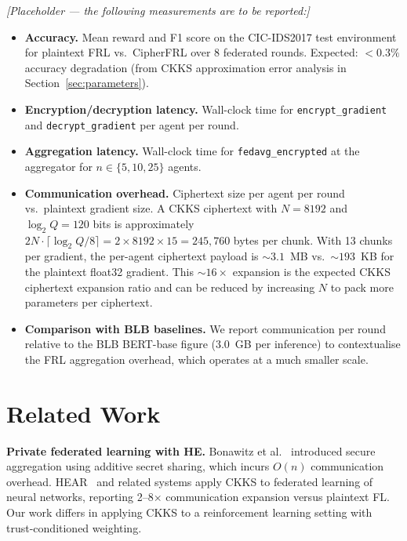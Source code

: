 \documentclass[letterpaper,journal]{IEEEtran}
\begin{document}
\textit{[Placeholder — the following measurements are to be reported:]}
\begin{itemize}
  \item \textbf{Accuracy.}
        Mean reward and F1 score on the CIC-IDS2017 test environment
        for plaintext FRL vs.\ CipherFRL over 8 federated rounds.
        Expected: $<0.3\%$ accuracy degradation (from CKKS approximation
        error analysis in Section~\ref{sec:parameters}).
  \item \textbf{Encryption/decryption latency.}
        Wall-clock time for \texttt{encrypt\_gradient} and
        \texttt{decrypt\_gradient} per agent per round.
  \item \textbf{Aggregation latency.}
        Wall-clock time for \texttt{fedavg\_encrypted} at the aggregator
        for $n \in \{5, 10, 25\}$ agents.
  \item \textbf{Communication overhead.}
        Ciphertext size per agent per round vs.\ plaintext gradient size.
        A CKKS ciphertext with $N=8192$ and $\log_2 Q = 120$ bits is
        approximately $2N \cdot \lceil \log_2 Q / 8 \rceil = 2 \times 8192
        \times 15 = 245{,}760$ bytes per chunk.
        With 13 chunks per gradient, the per-agent ciphertext payload is
        $\sim 3.1$~MB vs.\ $\sim 193$~KB for the plaintext float32 gradient.
        This $\sim 16\times$ expansion is the expected CKKS ciphertext
        expansion ratio and can be reduced by increasing $N$ to pack more
        parameters per ciphertext.
  \item \textbf{Comparison with BLB baselines.}
        We report communication per round relative to the BLB BERT-base
        figure (3.0~GB per inference) to contextualise the FRL aggregation
        overhead, which operates at a much smaller scale.
\end{itemize}

\section{Related Work}\label{sec:related}

\textbf{Private federated learning with HE.}
Bonawitz et al.~\cite{bonawitz2017} introduced secure aggregation using
additive secret sharing, which incurs $O(n)$ communication overhead.
HEAR~\cite{hear2022} and related systems apply CKKS to federated learning
of neural networks, reporting 2--8$\times$ communication expansion versus
plaintext FL.
Our work differs in applying CKKS to a reinforcement learning setting with
trust-conditioned weighting.
\end{document}
